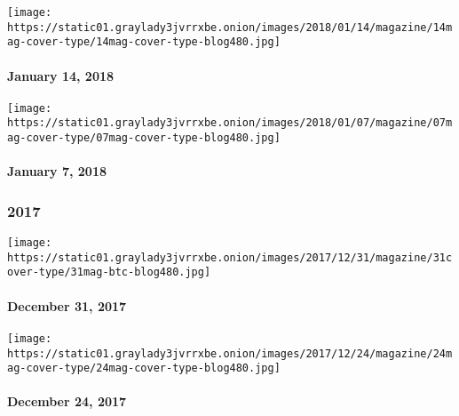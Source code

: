 \href{https://www.nytimes3xbfgragh.onion/issue/magazine/2018/01/19/11418-issue}{}

\texttt{[image: https://static01.graylady3jvrrxbe.onion/images/2018/01/14/magazine/14mag-cover-type/14mag-cover-type-blog480.jpg]}

\hypertarget{january-14-2018}{%
\paragraph{January 14, 2018}\label{january-14-2018}}

\href{https://www.nytimes3xbfgragh.onion/issue/magazine/2018/01/05/10718-issue}{}

\texttt{[image: https://static01.graylady3jvrrxbe.onion/images/2018/01/07/magazine/07mag-cover-type/07mag-cover-type-blog480.jpg]}

\hypertarget{january-7-2018}{%
\paragraph{January 7, 2018}\label{january-7-2018}}

\hypertarget{2017}{%
\subsubsection{2017}\label{2017}}

\href{https://www.nytimes3xbfgragh.onion/interactive/2017/12/28/magazine/the-lives-they-lived-2017.html}{}

\texttt{[image: https://static01.graylady3jvrrxbe.onion/images/2017/12/31/magazine/31cover-type/31mag-btc-blog480.jpg]}

\hypertarget{december-31-2017}{%
\paragraph{December 31, 2017}\label{december-31-2017}}

\href{https://www.nytimes3xbfgragh.onion/issue/magazine/2017/12/26/122417-issue}{}

\texttt{[image: https://static01.graylady3jvrrxbe.onion/images/2017/12/24/magazine/24mag-cover-type/24mag-cover-type-blog480.jpg]}

\hypertarget{december-24-2017}{%
\paragraph{December 24, 2017}\label{december-24-2017}}

\href{https://www.nytimes3xbfgragh.onion/interactive/2017/12/13/magazine/the-reckoning-women-and-power-in-the-workplace.html}{}

